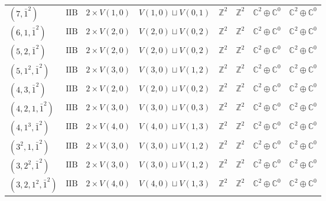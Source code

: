 \documentclass[11pt,a4paper]{article}
\begin{document}
\begin{appendix}
\begin{table}
\begin{tabular}{C{2.65cm}C{0.85cm}C{3.0cm}C{3.0cm}C{2.25cm}C{2.25cm}C{1.55cm}C{1.55cm}}
\((7, \bar{1}^{2})\) & \(\mathrm{IIB}\) & \(2 \times V(1,0)\) & \(V(1,0) \sqcup V(0,1)\) & \(\mathbb{Z}^{2}\) & \(\mathbb{Z}^{2}\) & \(\mathbb{C}^{2} \oplus \mathbb{C}^{0}\) & \(\mathbb{C}^{2} \oplus \mathbb{C}^{0}\) \\
\((6, 1, \bar{1}^{2})\) & \(\mathrm{IIB}\) & \(2 \times V(2,0)\) & \(V(2,0) \sqcup V(0,2)\) & \(\mathbb{Z}^{2}\) & \(\mathbb{Z}^{2}\) & \(\mathbb{C}^{2} \oplus \mathbb{C}^{0}\) & \(\mathbb{C}^{2} \oplus \mathbb{C}^{0}\) \\
\((5, 2, \bar{1}^{2})\) & \(\mathrm{IIB}\) & \(2 \times V(2,0)\) & \(V(2,0) \sqcup V(0,2)\) & \(\mathbb{Z}^{2}\) & \(\mathbb{Z}^{2}\) & \(\mathbb{C}^{2} \oplus \mathbb{C}^{0}\) & \(\mathbb{C}^{2} \oplus \mathbb{C}^{0}\) \\
\((5, 1^{2}, \bar{1}^{2})\) & \(\mathrm{IIB}\) & \(2 \times V(3,0)\) & \(V(3,0) \sqcup V(1,2)\) & \(\mathbb{Z}^{2}\) & \(\mathbb{Z}^{2}\) & \(\mathbb{C}^{2} \oplus \mathbb{C}^{0}\) & \(\mathbb{C}^{2} \oplus \mathbb{C}^{0}\) \\
\((4, 3, \bar{1}^{2})\) & \(\mathrm{IIB}\) & \(2 \times V(2,0)\) & \(V(2,0) \sqcup V(0,2)\) & \(\mathbb{Z}^{2}\) & \(\mathbb{Z}^{2}\) & \(\mathbb{C}^{2} \oplus \mathbb{C}^{0}\) & \(\mathbb{C}^{2} \oplus \mathbb{C}^{0}\) \\
\((4, 2, 1, \bar{1}^{2})\) & \(\mathrm{IIB}\) & \(2 \times V(3,0)\) & \(V(3,0) \sqcup V(0,3)\) & \(\mathbb{Z}^{2}\) & \(\mathbb{Z}^{2}\) & \(\mathbb{C}^{2} \oplus \mathbb{C}^{0}\) & \(\mathbb{C}^{2} \oplus \mathbb{C}^{0}\) \\
\((4, 1^{3}, \bar{1}^{2})\) & \(\mathrm{IIB}\) & \(2 \times V(4,0)\) & \(V(4,0) \sqcup V(1,3)\) & \(\mathbb{Z}^{2}\) & \(\mathbb{Z}^{2}\) & \(\mathbb{C}^{2} \oplus \mathbb{C}^{0}\) & \(\mathbb{C}^{2} \oplus \mathbb{C}^{0}\) \\
\((3^{2}, 1, \bar{1}^{2})\) & \(\mathrm{IIB}\) & \(2 \times V(3,0)\) & \(V(3,0) \sqcup V(1,2)\) & \(\mathbb{Z}^{2}\) & \(\mathbb{Z}^{2}\) & \(\mathbb{C}^{2} \oplus \mathbb{C}^{0}\) & \(\mathbb{C}^{2} \oplus \mathbb{C}^{0}\) \\
\((3, 2^{2}, \bar{1}^{2})\) & \(\mathrm{IIB}\) & \(2 \times V(3,0)\) & \(V(3,0) \sqcup V(1,2)\) & \(\mathbb{Z}^{2}\) & \(\mathbb{Z}^{2}\) & \(\mathbb{C}^{2} \oplus \mathbb{C}^{0}\) & \(\mathbb{C}^{2} \oplus \mathbb{C}^{0}\) \\
\((3, 2, 1^{2}, \bar{1}^{2})\) & \(\mathrm{IIB}\) & \(2 \times V(4,0)\) & \(V(4,0) \sqcup V(1,3)\) & \(\mathbb{Z}^{2}\) & \(\mathbb{Z}^{2}\) & \(\mathbb{C}^{2} \oplus \mathbb{C}^{0}\) & \(\mathbb{C}^{2} \oplus \mathbb{C}^{0}\) \\

\end{tabular}
\end{table}
\end{appendix}
\end{document}
